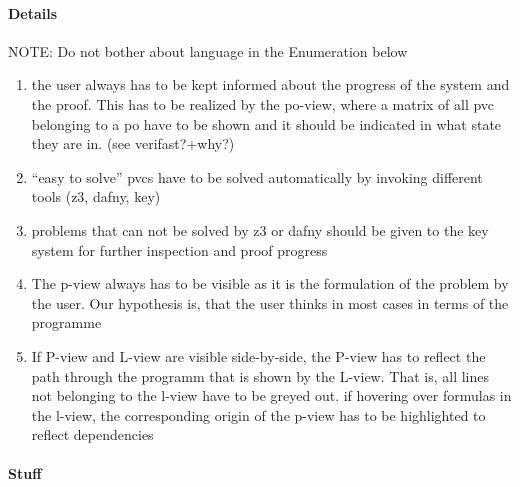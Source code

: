 \documentclass{article}
\begin{document}
\paragraph{Details}
NOTE: Do not bother about language in the Enumeration below
\begin{enumerate}
\item the user always has to be kept informed about the progress of the system 
and the proof. This has to be realized by the po-view, where a matrix of all 
pvc belonging to a po have to be shown and it should be indicated in what state
 they are in. (see verifast?+why?)
\item ``easy to solve'' pvcs have to be solved automatically by invoking 
different tools (z3, dafny, key)
\item problems that can not be solved by z3 or dafny should be given to the key 
system for further inspection and proof progress
 \item The  p-view always has to be visible as it is the formulation of the 
problem by the user. Our hypothesis is, that the user thinks in most cases in 
terms of the programme 
 \item If P-view and L-view are 
visible side-by-side, the P-view has to reflect the path through the programm 
that is shown by the L-view. That is, all lines not belonging to the l-view 
have to be greyed out. if hovering over formulas in the l-view, the 
corresponding origin of the p-view has to be highlighted to reflect dependencies

\end{enumerate}


\paragraph{Stuff}
\end{document}
